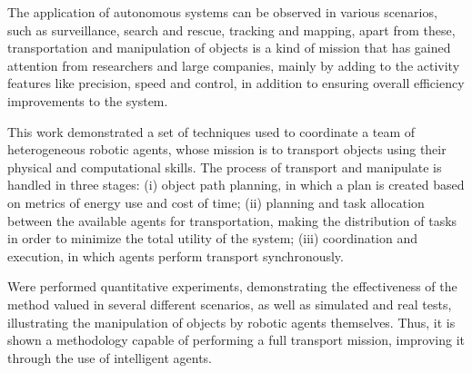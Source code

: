 The application of autonomous systems can be observed in various scenarios, such as surveillance, search and rescue, tracking and mapping, apart from these, transportation and manipulation of objects is a kind of mission that has gained attention from researchers and large companies, mainly by adding to the activity features like precision, speed and control, in addition to ensuring overall efficiency improvements to the system.

This work demonstrated a set of techniques used to coordinate a team of heterogeneous robotic agents, whose mission is to transport objects using their physical and computational skills.
The process of transport and manipulate is handled in three stages: (i) object path planning, in which a plan is created based on metrics of energy use and cost of time; (ii) planning and task allocation between the available agents for transportation, making the distribution of tasks in order to minimize the total utility of the system; (iii) coordination and execution, in which agents perform transport synchronously.

Were performed quantitative experiments, demonstrating the effectiveness of the method valued in several different scenarios, as well as simulated and real tests, illustrating the manipulation of objects by robotic agents themselves.
Thus, it is shown a methodology capable of performing a full transport mission, improving it through the use of intelligent agents.

